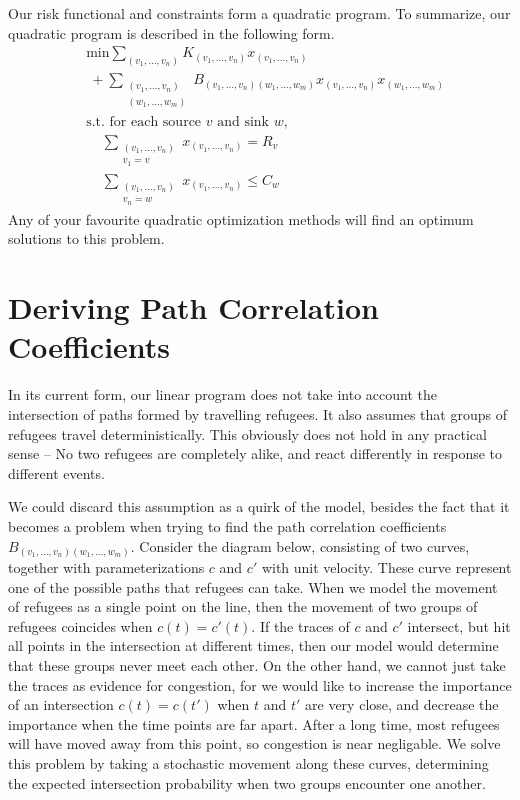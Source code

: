 \documentclass{article}
\begin{document}
Our risk functional and constraints form a quadratic program. To summarize, our quadratic program is described in the following form.
%
\begin{align*}
    &\text{min} \sum_{(v_1, \dots, v_n)} K_{(v_1, \dots, v_n)} x_{(v_1, \dots, v_n)}\\
    & \ + \sum_{\substack{(v_1, \dots, v_n)\\(w_1, \dots, w_m)}} B_{(v_1, \dots, v_n) (w_1, \dots, w_m)} x_{(v_1, \dots, v_n)} x_{(w_1, \dots, w_m)}\\
    &\text{s.t. for each source $v$ and sink $w$,}\\
    &\ \ \ \ \ \sum_{\substack{(v_1, \dots, v_n) \\ v_1 = v}} x_{(v_1, \dots, v_n)} = R_v\\
    &\ \ \ \ \ \sum_{\substack{(v_1, \dots, v_n) \\ v_n = w}} x_{(v_1, \dots, v_n)} \leq C_w
\end{align*}
%
Any of your favourite quadratic optimization methods will find an optimum solutions to this problem.

\section{Deriving Path Correlation Coefficients}

In its current form, our linear program does not take into account the intersection of paths formed by travelling refugees. It also assumes that groups of refugees travel deterministically. This obviously does not hold in any practical sense -- No two refugees are completely alike, and react differently in response to different events.

We could discard this assumption as a quirk of the model, besides the fact that it becomes a problem when trying to find the path correlation coefficients $B_{(v_1, \dots, v_n) (w_1, \dots, w_m)}$. Consider the diagram below, consisting of two curves, together with parameterizations $c$ and $c'$ with unit velocity. These curve represent one of the possible paths that refugees can take. When we model the movement of refugees as a single point on the line, then the movement of two groups of refugees coincides when $c(t) = c'(t)$. If the traces of $c$ and $c'$ intersect, but hit all points in the intersection at different times, then our model would determine that these groups never meet each other. On the other hand, we cannot just take the traces as evidence for congestion, for we would like to increase the importance of an intersection $c(t) = c(t')$ when $t$ and $t'$ are very close, and decrease the importance when the time points are far apart. After a long time, most refugees will have moved away from this point, so congestion is near negligable. We solve this problem by taking a stochastic movement along these curves, determining the expected intersection probability when two groups encounter one another.
\end{document}
